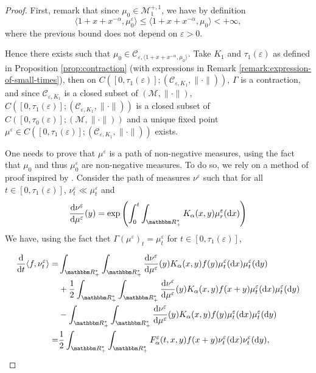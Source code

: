 \documentclass[a4paper,11pt, reqno]{amsart}
\newcommand{\cC}{\mathcal{C}}	\newcommand{\CC}{\mathbbm{C}}
\newcommand{\cM}{\mathcal{M}}	\newcommand{\MM}{\mathbbm{M}}
\newcommand{\eps}{\varepsilon}
\newcommand{\dd}{\mathop{}\!\mathrm{d}}
\newcommand{\1}{\mathbbm{1}}
\theoremstyle{plain}
\theoremstyle{definition}
\begin{document}
\begin{proof}
  First, remark that since $\mu_0 \in \cM^{+, 1}_1$, we have by
  definition
  \[ \langle 1 + x + x^{- \alpha}, \mu_0^{\eps} \rangle \le
     \langle 1 + x + x^{- \alpha}, \mu_0 \rangle < + \infty, \]
  where the previous bound does not depend on $\eps > 0$.
  
  Hence there exists such that $\mu_0 \in \cC_{\eps, \langle 1
  + x + x^{- \alpha}, \mu_0 \rangle}$. Take $K_1$ and $\tau_1 (\eps)$
  as defined in Proposition \ref{prop:contraction} (with expressions in Remark
  \ref{remark:expression-of-small-times}), then on $C ([0, \tau_1
  (\eps)] ; (\cC_{\eps, K_1}, \| \cdot \|))$, $\Gamma$
  is a contraction, and since $\cC_{\eps, K_1}$ is a closed
  subset of $(\cM, \| \cdot \|)$, $C ([0, \tau_1 (\eps)] ;
  (\cC_{\eps, K_1}, \| \cdot \|))$ is a closed subset of $C
  ([0, \tau_0 (\eps)] ; (\cM, \| \cdot \|))$ and a unique
  fixed point $\mu^{\eps} \in C ([0, \tau_1 (\eps)] ;
  (\cC_{\eps, K_1}, \| \cdot \|))$ exists.
  
  One needs to prove that $\mu^{\eps}$ is a path of non-negative
  measures, using the fact that $\mu_0$ and thus $\mu_0^{\eps}$ are
  non-negative measures. To do so, we rely on a method of proof inspired by
  {\cite{norrisSmoluchowskisCoagulationEquation1999}}. Consider the path of
  measures $\nu^{\eps}$ such that for all $t \in [0, \tau_1
  (\eps)]$, $\nu^{\eps}_t \ll \mu^{\eps}_t$ and
  \[ \frac{\dd \nu^{\eps}}{\dd \mu^{\eps}} (y) = \exp
     \left( \int_0^t \int_{\RR^{\ast}_+} K_{\alpha} (x, y)
     \mu_r^{\eps} (\dd x) \right) \]
  We have, using the fact thet $\Gamma (\mu^{\eps})_t =
  \mu^{\eps}_t$ for $t \in [0, \tau_1 (\eps)]$,
  
  \begin{align*}
    \frac{\dd}{\dd t} \langle f, \nu^{\eps}_t \rangle = &
    \int_{\RR^{\ast}_+} \int_{\RR^{\ast}_+} \frac{\dd
    \nu^{\eps}}{\dd \mu^{\eps}} (y) K_{\alpha} (x, y) f (y)
    \mu_t^{\eps} (\dd x) \mu^{\eps}_t (\dd y)\\
    & + \frac{1}{2} \int_{\RR^{\ast}_+} \int_{\RR^{\ast}_+}
    \frac{\dd \nu^{\eps}}{\dd \mu^{\eps}} (y) K_{\alpha}
    (x, y) f (x + y) \mu_t^{\eps} (\dd x) \mu^{\eps}_t
    (\dd y)\\
    & - \int_{\RR^{\ast}_+} \int_{\RR^{\ast}_+} \frac{\dd
    \nu^{\eps}}{\dd \mu^{\eps}} (y) K_{\alpha} (x, y) f (y)
    \mu_t^{\eps} (\dd x) \mu^{\eps}_t (\dd y)\\
    = & \frac{1}{2} \int_{\RR^{\ast}_+} \int_{\RR^{\ast}_+}
    F_{\alpha}^{\eps} (t, x, y) f (x + y) \nu_t^{\eps} (\dd
    x) \nu^{\eps}_t (\dd y),
  \end{align*}
  

\end{proof}
\end{document}
